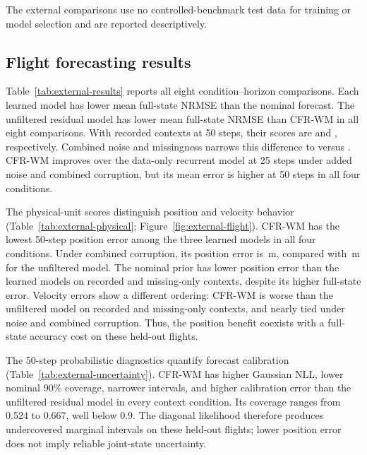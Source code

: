 The external comparisons use no controlled-benchmark test data for training or
model selection and are reported descriptively.

\subsection{Flight forecasting results}

Table~\ref{tab:external-results} reports all eight condition--horizon
comparisons. Each learned model has lower mean full-state NRMSE than the
nominal forecast. The unfiltered residual model has lower mean full-state
NRMSE than CFR-WM in all eight comparisons. With recorded contexts at 50 steps,
their scores are \ExternalUnfilteredRecordedLongNRMSEMean{} and
\ExternalCFRRecordedLongNRMSEMean{}, respectively. Combined noise and
missingness narrows this difference to
\ExternalUnfilteredCombinedLongNRMSEMean{} versus
\ExternalCFRCombinedLongNRMSEMean{}.
CFR-WM improves over the data-only recurrent model at 25 steps under added
noise and combined corruption, but its mean error is higher at 50 steps
in all four conditions.

The physical-unit scores distinguish position and velocity behavior
(Table~\ref{tab:external-physical}; Figure~\ref{fig:external-flight}).
CFR-WM has the lowest 50-step position error among the three learned models
in all four conditions. Under combined corruption, its position error is
\ExternalCFRCombinedLongPositionMean{}\,m, compared with
\ExternalUnfilteredCombinedLongPositionMean{}\,m for the unfiltered model.
The nominal prior has lower position error than the learned models on
recorded and missing-only contexts, despite its higher full-state error.
Velocity errors show a different ordering: CFR-WM is worse than the
unfiltered model on recorded and missing-only contexts, and nearly tied
under noise and combined corruption. Thus, the position benefit coexists
with a full-state accuracy cost on these held-out flights.

The 50-step probabilistic diagnostics quantify forecast calibration
(Table~\ref{tab:external-uncertainty}). CFR-WM has higher Gaussian
NLL, lower nominal 90\% coverage, narrower intervals, and higher calibration
error than the unfiltered residual model in every context condition. Its
coverage ranges from 0.524 to 0.667, well below 0.9. The diagonal likelihood
therefore produces undercovered marginal intervals on these held-out flights;
lower position error does not imply reliable joint-state uncertainty.

